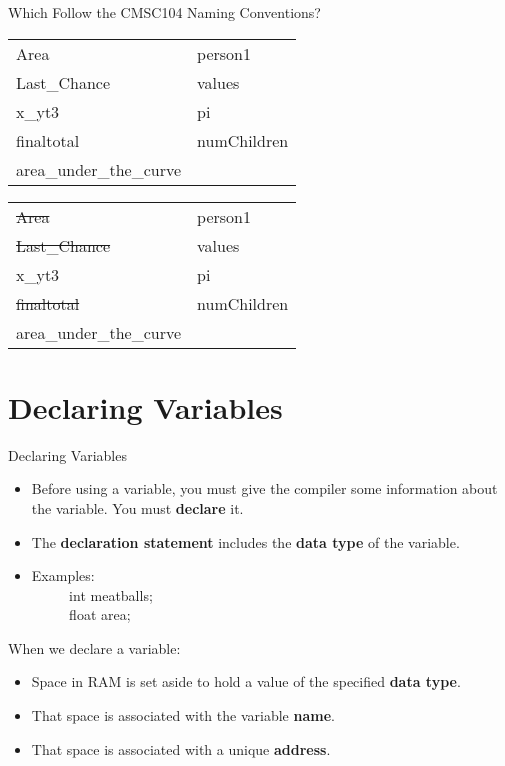 \documentclass[graphics]{beamer}
\begin{document}
\begin{frame}{Which Follow the CMSC104 Naming Conventions?}
    \centering
     {
        \begin{tabular}{l l}
            Area & person1 \\ [5pt]
            Last\_Chance & values \\ [5pt]
            x\_yt3 & pi \\ [5pt]
            finaltotal & numChildren \\ [5pt]
            area\_under\_the\_curve
        \end{tabular}
    }
     {
        \begin{tabular}{l l}
            \sout{Area} & person1 \\ [5pt]
            \sout{Last\_Chance} & values \\ [5pt]
            x\_yt3 & pi \\ [5pt]
            \sout{finaltotal} & numChildren \\ [5pt]
            area\_under\_the\_curve
        \end{tabular}
    }
\end{frame}

\section*{Declaring Variables}
\begin{frame}{Declaring Variables}
     {
        \begin{itemize}
            \item Before using a variable, you must give the compiler some information about the variable. You must \textbf{declare} it.
            \item The \textbf{declaration statement} includes the \textbf{data type} of the variable.
            \item Examples: \\
            ~~ ~~ int meatballs; \\
            ~~ ~~ float area;
        \end{itemize}
    }
     {
        When we declare a variable:
        \begin{itemize}
            \item Space in RAM is set aside to hold a value of the specified \textbf{data type}.
            \item That space is associated with the variable \textbf{name}.
            \item That space is associated with a unique \textbf{address}.
        \end{itemize}
        
    }
\end{frame}
\end{document}
